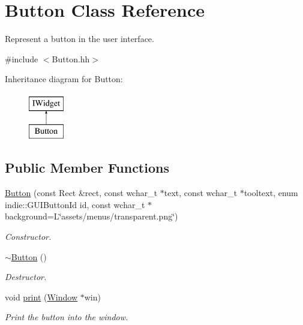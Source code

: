 \hypertarget{classButton}{}\section{Button Class Reference}
\label{classButton}


Represent a button in the user interface.  




{\ttfamily \#include $<$Button.\+hh$>$}

Inheritance diagram for Button\+:\begin{figure}[H]
\begin{center}
\leavevmode
\includegraphics[height=2.000000cm]{classButton}
\end{center}
\end{figure}
\subsection*{Public Member Functions}
\begin{DoxyCompactItemize}
\item 
\hyperlink{classButton_a5729094ff8ec4ce3e64e6691c297983c}{Button} (const Rect \&rect, const wchar\+\_\+t $\ast$text, const wchar\+\_\+t $\ast$tooltext, enum indie\+::\+G\+U\+I\+Button\+Id id, const wchar\+\_\+t $\ast$background=L\char`\"{}assets/menus/transparent.\+png\char`\"{})
\begin{DoxyCompactList}\small\item\em Constructor. \end{DoxyCompactList}\item 
\hyperlink{classButton_a2a001eb9c3cc8ae54768a850dd345002}{$\sim$\+Button} ()
\begin{DoxyCompactList}\small\item\em Destructor. \end{DoxyCompactList}\item 
void \hyperlink{classButton_aaee0c62414711ae91084b05b38d0c8c5}{print} (\hyperlink{classWindow}{Window} $\ast$win)
\begin{DoxyCompactList}\small\item\em Print the button into the window. \end{DoxyCompactList}\end{DoxyCompactItemize}


